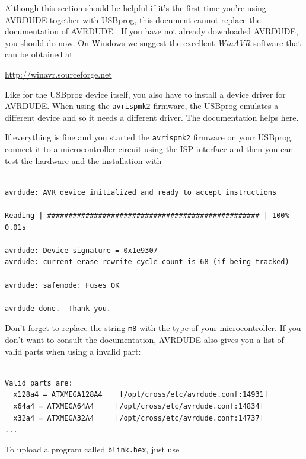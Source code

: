 \documentclass[bibtotoc,UKenglish,halfparskip,oneside,DIV12]{scrreprt}
\begin{document}
Although this section should be helpful if it's the first time you're using AVRDUDE together with
USBprog, this document cannot replace the documentation of AVRDUDE \cite{AVRdude}. If you have not
already downloaded AVRDUDE, you should do now. On Windows we suggest the excellent \emph{WinAVR}
software that can be obtained at

 \url{http://winavr.sourceforge.net}

Like for the USBprog device itself, you also have to install a device driver for AVRDUDE. When using
the \texttt{avrispmk2} firmware, the USBprog emulates a different device and so it needs a different
driver. The documentation \cite{WinavrManual} helps here.

If everything is fine and you started the \texttt{avrispmk2} firmware on your USBprog, connect it to
a microcontroller circuit using the ISP interface and then you can test the hardware and the
installation with

\begin{lstlisting}[style=inline]
% avrdude -c avrispmkII -P usb -p m8

avrdude: AVR device initialized and ready to accept instructions

Reading | ################################################## | 100% 0.01s

avrdude: Device signature = 0x1e9307
avrdude: current erase-rewrite cycle count is 68 (if being tracked)

avrdude: safemode: Fuses OK

avrdude done.  Thank you.

\end{lstlisting}

Don't forget to replace the string \texttt{m8} with the type of your microcontroller. If you don't
want to consult the documentation, AVRDUDE also gives you a list of valid parts when using a invalid
part:

\begin{lstlisting}[style=inline]
% avrdude -p ?

Valid parts are:
  x128a4 = ATXMEGA128A4    [/opt/cross/etc/avrdude.conf:14931]
  x64a4 = ATXMEGA64A4     [/opt/cross/etc/avrdude.conf:14834]
  x32a4 = ATXMEGA32A4     [/opt/cross/etc/avrdude.conf:14737]
...
\end{lstlisting}

To upload a program called \texttt{blink.hex}, just use

\begin{lstlisting}[style=inline]
% avrdude -p m8 -e -U flash:w:blink.hex -y
\end{lstlisting}
\end{document}
